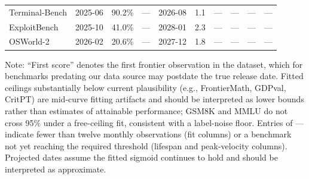 \begin{table}[t]
\begin{threeparttable}
{\begin{tabular}{lccccccccc}
Terminal-Bench       & 2025-06 & 90.2\% & ---     & 2026-08 & 1.1 & ---      & ---  & ---  & ---  \\
ExploitBench         & 2025-10 & 41.0\% & ---     & 2028-01 & 2.3 & ---      & ---  & ---  & ---  \\
OSWorld-2            & 2026-02 & 20.6\% & ---     & 2027-12 & 1.8 & ---      & ---  & ---  & ---  \\
\bottomrule
\end{tabular}%
}
\begin{tablenotes}
\footnotesize
\item Note: ``First score'' denotes the first frontier observation in the dataset, which for benchmarks predating our data source may postdate the true release date. Fitted ceilings substantially below current plausibility (e.g., FrontierMath, GDPval, CritPT) are mid-curve fitting artifacts and should be interpreted as lower bounds rather than estimates of attainable performance; GSM8K and MMLU do not cross 95\% under a free-ceiling fit, consistent with a label-noise floor. Entries of --- indicate fewer than twelve monthly observations (fit columns) or a benchmark not yet reaching the required threshold (lifespan and peak-velocity columns). Projected dates assume the fitted sigmoid continues to hold and should be interpreted as approximate.
\end{tablenotes}
\end{threeparttable}
\end{table}
